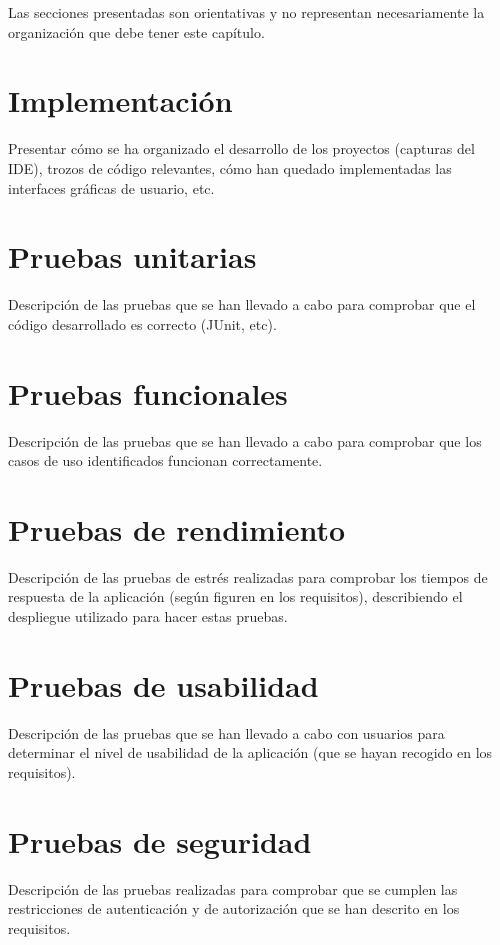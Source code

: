 Las secciones presentadas son orientativas y no representan
necesariamente la organización que debe tener este capítulo.
\section{Implementación}
Presentar cómo se ha organizado el desarrollo de los proyectos
(capturas del IDE), trozos de código relevantes, cómo han quedado
implementadas las interfaces gráficas de usuario, etc.
\section{Pruebas unitarias}
Descripción de las pruebas que se han llevado a cabo para comprobar que el código
desarrollado es correcto (JUnit, etc).
\section{Pruebas funcionales}
Descripción de las pruebas que se han llevado a cabo para comprobar que los casos de uso
identificados funcionan correctamente.
\section{Pruebas de rendimiento}
Descripción de las pruebas de estrés realizadas para comprobar los tiempos de
respuesta de la aplicación (según figuren en los requisitos), describiendo el despliegue utilizado para hacer estas pruebas.
\section{Pruebas de usabilidad}
Descripción de las pruebas que se han llevado a cabo con usuarios para determinar el
nivel de usabilidad de la aplicación (que se hayan recogido en los requisitos).
\section{Pruebas de seguridad}
Descripción de las pruebas realizadas para comprobar que se cumplen las
restricciones de autenticación y de autorización que se han descrito
en los requisitos.